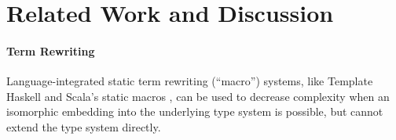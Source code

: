 \documentclass[10pt,preprint]{sigplanconf}
\begin{document}
\section{Related Work and Discussion}\label{prior-work}



\paragraph{Term Rewriting}
Language-integrated static term rewriting  (``macro'') systems, like Template Haskell \cite{SheardPeytonJones:Haskell-02} and Scala's static macros \cite{ScalaMacros2013}, can be used to decrease complexity when an isomorphic embedding into the underlying type system is possible, but cannot extend the type system directly.%
\end{document}
